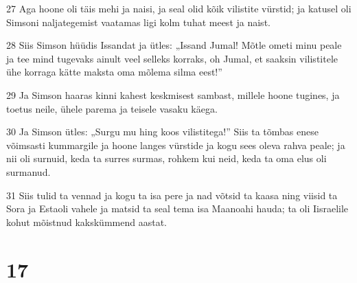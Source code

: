 \par 27 Aga hoone oli täis mehi ja naisi, ja seal olid kõik vilistite vürstid; ja katusel oli Simsoni naljategemist vaatamas ligi kolm tuhat meest ja naist.
\par 28 Siis Simson hüüdis Issandat ja ütles: „Issand Jumal! Mõtle ometi minu peale ja tee mind tugevaks ainult veel selleks korraks, oh Jumal, et saaksin vilistitele ühe korraga kätte maksta oma mõlema silma eest!”
\par 29 Ja Simson haaras kinni kahest keskmisest sambast, millele hoone tugines, ja toetus neile, ühele parema ja teisele vasaku käega.
\par 30 Ja Simson ütles: „Surgu mu hing koos vilistitega!” Siis ta tõmbas enese võimsasti kummargile ja hoone langes vürstide ja kogu sees oleva rahva peale; ja nii oli surnuid, keda ta surres surmas, rohkem kui neid, keda ta oma elus oli surmanud.
\par 31 Siis tulid ta vennad ja kogu ta isa pere ja nad võtsid ta kaasa ning viisid ta Sora ja Estaoli vahele ja matsid ta seal tema isa Maanoahi hauda; ta oli Iisraelile kohut mõistnud kakskümmend aastat.

\chapter{17}

